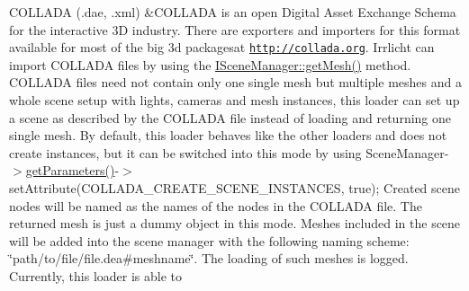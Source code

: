 \begin{longtabu}
C\+O\+L\+L\+A\+DA (.dae, .xml) &C\+O\+L\+L\+A\+DA is an open Digital Asset Exchange Schema for the interactive 3D industry. There are exporters and importers for this format available for most of the big 3d packagesat \href{http://collada.org}{\tt http\+://collada.\+org}. Irrlicht can import C\+O\+L\+L\+A\+DA files by using the \hyperlink{classirr_1_1scene_1_1ISceneManager_a63894c3f3d46cfc385116f1705935e03}{I\+Scene\+Manager\+::get\+Mesh()} method. C\+O\+L\+L\+A\+DA files need not contain only one single mesh but multiple meshes and a whole scene setup with lights, cameras and mesh instances, this loader can set up a scene as described by the C\+O\+L\+L\+A\+DA file instead of loading and returning one single mesh. By default, this loader behaves like the other loaders and does not create instances, but it can be switched into this mode by using Scene\+Manager-\/$>$\hyperlink{classirr_1_1scene_1_1ISceneManager_a4dba8ee7f48fdf6ede2c3f4b5fabcad3}{get\+Parameters()}-\/$>$set\+Attribute(\+C\+O\+L\+L\+A\+D\+A\+\_\+\+C\+R\+E\+A\+T\+E\+\_\+\+S\+C\+E\+N\+E\+\_\+\+I\+N\+S\+T\+A\+N\+C\+E\+S, true); Created scene nodes will be named as the names of the nodes in the C\+O\+L\+L\+A\+DA file. The returned mesh is just a dummy object in this mode. Meshes included in the scene will be added into the scene manager with the following naming scheme\+: \char`\"{}path/to/file/file.\+dea\#meshname\char`\"{}. The loading of such meshes is logged. Currently, this loader is able to


\end{longtabu}

